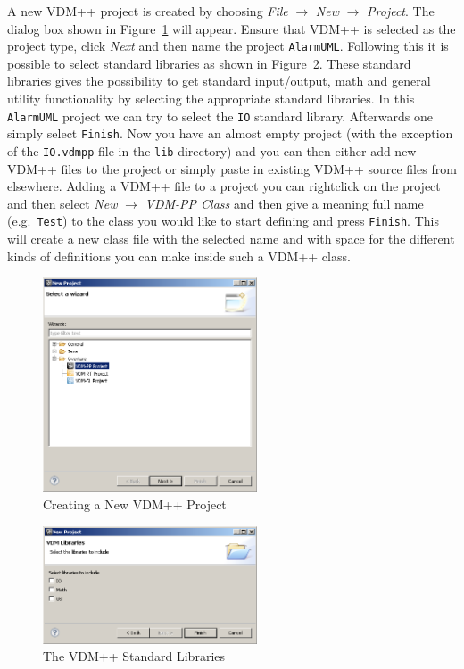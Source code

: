 A new VDM++ project is created by choosing \emph{File} $ \rightarrow$
\emph{New} $\rightarrow$ \emph{Project}. The dialog box shown in
Figure~\ref{fig:newoverturePPproject} will appear. Ensure that VDM++
is selected as the project type, click \emph{Next} and then name the
project \texttt{AlarmUML}. Following this it is possible
to select standard libraries as shown in
Figure~\ref{fig:stdlibs}. These standard libraries gives the possibility to get standard
input/output, math and general utility functionality by selecting the
appropriate standard libraries. In this \texttt{AlarmUML} project we can
try to select the \texttt{IO} standard library. Afterwards one simply
select \texttt{Finish}. Now you have an almost empty project (with the
exception of the \texttt{IO.vdmpp} file in the \texttt{lib} directory)
and you can then either add new VDM++ files to the project or simply paste in existing
VDM++ source files from elsewhere. Adding a VDM++ file to a project
you can rightclick on the project and then select \emph{New}
$\rightarrow$ \emph{VDM-PP Class} and then give a meaning full name
(e.g.\ \texttt{Test}) to the class you would like to start defining and press
\texttt{Finish}. This will create a new class file with the
selected name and with space for the different kinds of definitions
you can make inside such a VDM++ class.

\begin{figure}[!htb]
\begin{center}
  \includegraphics[width=2.5in]{figures/newoverturePPproject}
  \caption[labelInTOC]{Creating a New VDM++ Project}
  \label{fig:newoverturePPproject}
\end{center}
\end{figure}

\begin{figure}[!htb]
\begin{center}
  \includegraphics[width=2.5in]{figures/stdlibs}
  \caption[labelInTOC]{The VDM++ Standard Libraries}
  \label{fig:stdlibs}
\end{center}
\end{figure}

